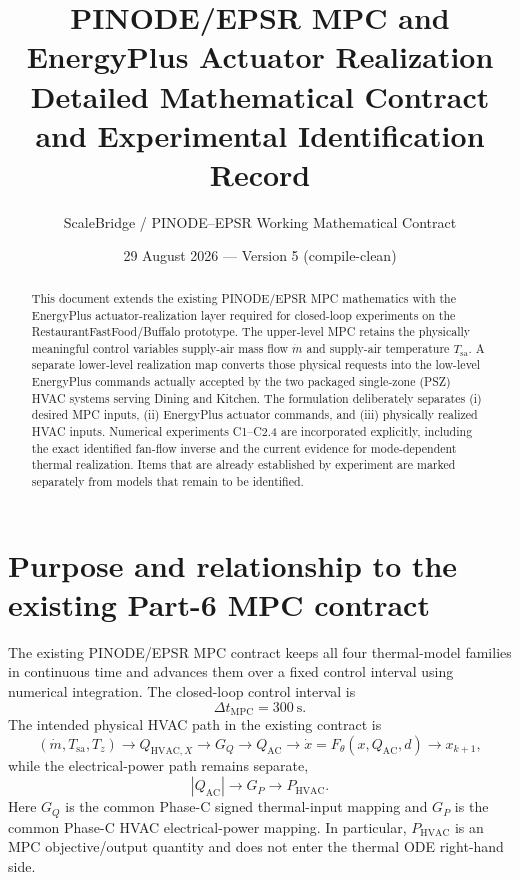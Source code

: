 \documentclass[11pt]{article}
\title{PINODE/EPSR MPC and EnergyPlus Actuator Realization\\
Detailed Mathematical Contract and Experimental Identification Record}
\author{ScaleBridge / PINODE--EPSR Working Mathematical Contract}
\date{29 August 2026 --- Version 5 (compile-clean)}
\newcommand{\mdot}{\dot m}
\newcommand{\Qx}{Q_{\mathrm{HVAC},X}}
\newcommand{\Qac}{Q_{\mathrm{AC}}}
\newcommand{\Phvac}{P_{\mathrm{HVAC}}}
\begin{document}
\maketitle

\begin{abstract}
This document extends the existing PINODE/EPSR MPC mathematics with the
EnergyPlus actuator-realization layer required for closed-loop experiments on
the RestaurantFastFood/Buffalo prototype.  The upper-level MPC retains the
physically meaningful control variables supply-air mass flow
$\mdot$ and supply-air temperature $T_{\mathrm{sa}}$.  A separate lower-level realization
map converts those physical requests into the low-level EnergyPlus commands
actually accepted by the two packaged single-zone (PSZ) HVAC systems serving
Dining and Kitchen.  The formulation deliberately separates (i) desired MPC
inputs, (ii) EnergyPlus actuator commands, and (iii) physically realized HVAC
inputs.  Numerical experiments C1--C2.4 are incorporated explicitly, including
the exact identified fan-flow inverse and the current evidence for
mode-dependent thermal realization.  Items that are already established by
experiment are marked separately from models that remain to be identified.
\end{abstract}

\section{Purpose and relationship to the existing Part-6 MPC contract}

The existing PINODE/EPSR MPC contract keeps all four thermal-model families in
continuous time and advances them over a fixed control interval using numerical
integration.  The closed-loop control interval is
\begin{equation}
\Delta t_{\mathrm{MPC}} = 300~\mathrm{s}.
\label{eq:mpc-dt}
\end{equation}
The intended physical HVAC path in the existing contract is
\begin{equation}
(\mdot,T_{\mathrm{sa}},T_z)
\longrightarrow
\Qx
\longrightarrow
G_Q
\longrightarrow
\Qac
\longrightarrow
\dot x = F_\theta(x,\Qac,d)
\longrightarrow
x_{k+1},
\label{eq:existing-thermal-chain}
\end{equation}
while the electrical-power path remains separate,
\begin{equation}
|\Qac|
\longrightarrow
G_P
\longrightarrow
\Phvac.
\label{eq:existing-power-chain}
\end{equation}
Here $G_Q$ is the common Phase-C signed thermal-input mapping and $G_P$ is the
common Phase-C HVAC electrical-power mapping.  In particular, $\Phvac$ is an
MPC objective/output quantity and does not enter the thermal ODE right-hand
side.
\end{document}
